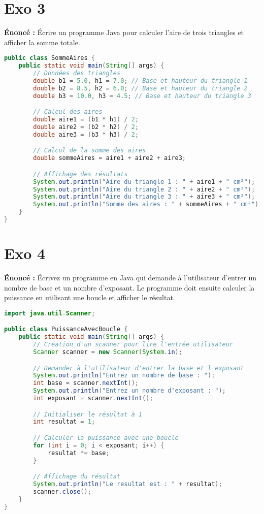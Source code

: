 \documentclass{article}
\begin{document}
\section*{Exo 3}
\noindent \textbf{Énoncé :} Écrire un programme Java pour calculer l'aire de trois triangles et afficher la somme totale.

\begin{lstlisting}[language=Java]
public class SommeAires {
    public static void main(String[] args) {
        // Données des triangles
        double b1 = 5.0, h1 = 7.0; // Base et hauteur du triangle 1
        double b2 = 8.5, h2 = 6.0; // Base et hauteur du triangle 2
        double b3 = 10.0, h3 = 4.5; // Base et hauteur du triangle 3

        // Calcul des aires
        double aire1 = (b1 * h1) / 2;
        double aire2 = (b2 * h2) / 2;
        double aire3 = (b3 * h3) / 2;

        // Calcul de la somme des aires
        double sommeAires = aire1 + aire2 + aire3;

        // Affichage des résultats
        System.out.println("Aire du triangle 1 : " + aire1 + " cm²");
        System.out.println("Aire du triangle 2 : " + aire2 + " cm²");
        System.out.println("Aire du triangle 3 : " + aire3 + " cm²");
        System.out.println("Somme des aires : " + sommeAires + " cm²");
    }
}
\end{lstlisting}
\clearpage

\section*{Exo 4}
\noindent \textbf{Énoncé :} Écrivez un programme en Java qui demande \`a l'utilisateur d'entrer un nombre de base et un nombre d'exposant. Le programme doit ensuite calculer la puissance en utilisant une boucle et afficher le r\'esultat.

\begin{lstlisting}[language=Java]
import java.util.Scanner;

public class PuissanceAvecBoucle {
    public static void main(String[] args) {
        // Création d'un scanner pour lire l'entrée utilisateur
        Scanner scanner = new Scanner(System.in);

        // Demander à l'utilisateur d'entrer la base et l'exposant
        System.out.println("Entrez un nombre de base : ");
        int base = scanner.nextInt();
        System.out.println("Entrez un nombre d'exposant : ");
        int exposant = scanner.nextInt();

        // Initialiser le résultat à 1
        int resultat = 1;

        // Calculer la puissance avec une boucle
        for (int i = 0; i < exposant; i++) {
            resultat *= base;
        }

        // Affichage du résultat
        System.out.println("Le resultat est : " + resultat);
        scanner.close();
    }
}
\end{lstlisting}
\clearpage
\end{document}
